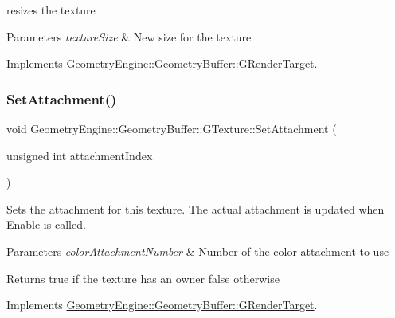 resizes the texture 
\begin{DoxyParams}{Parameters}
{\em texture\+Size} & New size for the texture \\
\hline
\end{DoxyParams}


Implements \mbox{\hyperlink{class_geometry_engine_1_1_geometry_buffer_1_1_g_render_target_ac1e54f456408b53de44fe10116d649dd}{Geometry\+Engine\+::\+Geometry\+Buffer\+::\+G\+Render\+Target}}.

\mbox{\label{class_geometry_engine_1_1_geometry_buffer_1_1_g_texture_a30c0e98fd265c6f47fe7df0ad4f39644}} 
\subsubsection{\texorpdfstring{SetAttachment()}{SetAttachment()}\hspace{0.1cm}{\footnotesize\ttfamily [1/2]}}
{\footnotesize\ttfamily void Geometry\+Engine\+::\+Geometry\+Buffer\+::\+G\+Texture\+::\+Set\+Attachment (\begin{DoxyParamCaption}\item[{unsigned int}]{attachment\+Index }\end{DoxyParamCaption})\hspace{0.3cm}{\ttfamily [virtual]}}

Sets the attachment for this texture. The actual attachment is updated when Enable is called. 
\begin{DoxyParams}{Parameters}
{\em color\+Attachment\+Number} & Number of the color attachment to use \\
\hline
\end{DoxyParams}
\begin{DoxyReturn}{Returns}
true if the texture has an owner false otherwise 
\end{DoxyReturn}


Implements \mbox{\hyperlink{class_geometry_engine_1_1_geometry_buffer_1_1_g_render_target_a1031c44ad374654e2183d3b1b99638a3}{Geometry\+Engine\+::\+Geometry\+Buffer\+::\+G\+Render\+Target}}.

\mbox{\label{class_geometry_engine_1_1_geometry_buffer_1_1_g_texture_a1dc99966bc21411656dc776d429b377d}} 
